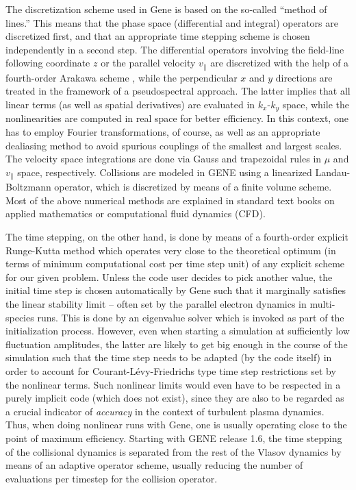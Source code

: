 \documentclass[12pt]{article}
\begin{document}
The discretization scheme used in {\sc Gene} is based on the so-called ``method of lines.'' This
means that the phase space (differential and integral) operators are discretized first, and that
an appropriate time stepping scheme is chosen independently in a second step. The differential
operators involving the field-line following coordinate $z$ or the parallel velocity $v_\|$ are
discretized with the help of a fourth-order Arakawa scheme \cite{Arakawa66}, while the
perpendicular $x$ and $y$ directions are treated in the framework of a pseudospectral approach.
The latter implies that all linear terms (as well as spatial derivatives) are evaluated in
$k_x$-$k_y$ space, while the nonlinearities are computed in real space for better efficiency.
In this context, one has to employ Fourier transformations, of course, as well as an appropriate
dealiasing method to avoid spurious couplings of the smallest and largest scales. The velocity
space integrations are done via Gauss and trapezoidal rules in $\mu$ and $v_\|$ space, respectively.
Collisions are modeled in GENE using a linearized Landau-Boltzmann operator, which is discretized
by means of a finite volume scheme. Most of the above numerical methods are explained in standard
text books on applied mathematics or computational fluid dynamics (CFD).

The time stepping, on the other hand, is done by means of a fourth-order explicit Runge-Kutta method
which operates very close to the theoretical optimum (in terms of minimum computational cost per
time step unit) of any explicit scheme for our given problem. Unless the code user decides to pick
another value, the initial time step is chosen automatically by {\sc Gene} such that it marginally
satisfies the linear stability limit -- often set by the parallel electron dynamics in multi-species
runs. This is done by an eigenvalue solver which is invoked as part of the initialization process.
However, even when starting a simulation at sufficiently low fluctuation amplitudes, the latter are
likely to get big enough in the course of the simulation such that the time step needs to be adapted
(by the code itself) in order to account for Courant-L\'evy-Friedrichs type time step restrictions
set by the nonlinear terms. Such nonlinear limits would even have to be respected in a purely implicit
code (which does not exist), since they are also to be regarded as a crucial indicator of {\em accuracy}
in the context of turbulent plasma dynamics. Thus, when doing nonlinear runs with {\sc Gene}, one is
usually operating close to the point of maximum efficiency.
Starting with GENE release 1.6, the time stepping of the collisional dynamics is separated from the
rest of the Vlasov dynamics by means of an adaptive operator scheme, usually reducing the number of
evaluations per timestep for the collision operator.
\end{document}
